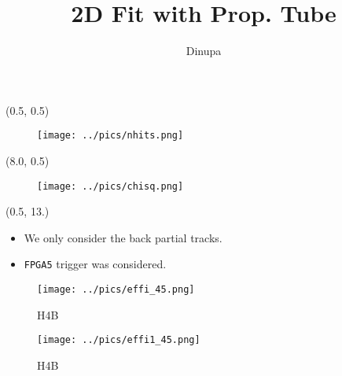 \documentclass[10pt, xcolor={dvipsnames}, aspectratio = 169]{beamer}
\title{2D Fit with Prop. Tube}
\author{Dinupa}
\begin{document}
\begin{frame}
\maketitle
\end{frame}


\begin{frame}[fragile]

\begin{textblock}{7.0}(0.5, 0.5)
\begin{figure}
\centering
\texttt{[image: ../pics/nhits.png]}
\end{figure}
\end{textblock}

\begin{textblock}{7.0}(8.0, 0.5)
\begin{figure}
\centering
\texttt{[image: ../pics/chisq.png]}
\end{figure}
\end{textblock}

\begin{textblock}{10.0}(0.5, 13.)
\begin{itemize}

	\item We only consider the back partial tracks.
	\item \verb|FPGA5| trigger was considered.
\end{itemize}
\end{textblock}

\end{frame}


\begin{frame}

\begin{figure}
\centering
\texttt{[image: ../pics/effi\_45.png]}
\caption{H4B}
\end{figure}

\end{frame}


\begin{frame}

\begin{figure}
\centering
\texttt{[image: ../pics/effi1\_45.png]}
\caption{H4B}
\end{figure}

\end{frame}
\end{document}
